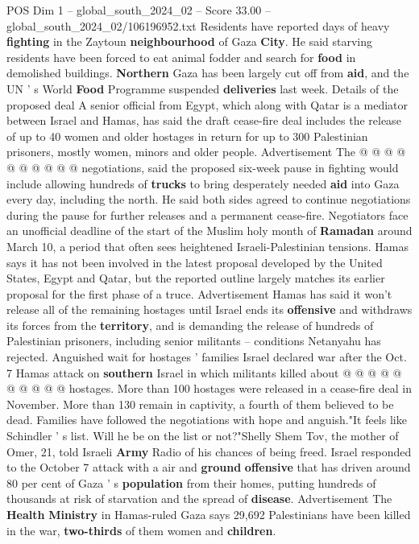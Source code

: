 \begin{textsample}{POS Dim 1 – global\_south\_2024\_02 – Score 33.00 – global\_south\_2024\_02/106196952.txt}
Residents have reported days of heavy \textbf{fighting} in the Zaytoun \textbf{neighbourhood} of Gaza \textbf{City}.
He said starving residents have been forced to eat animal fodder and search for \textbf{food} in demolished buildings. \textbf{Northern} Gaza has been largely cut off from \textbf{aid}, and the UN ' s World \textbf{Food} Programme suspended \textbf{deliveries} last week.
Details of the proposed deal A senior official from Egypt, which along with Qatar is a mediator between Israel and Hamas, has said the draft cease-fire deal includes the release of up to 40 women and older hostages in return for up to 300 Palestinian prisoners, mostly women, minors and older people.
Advertisement The @ @ @ @ @ @ @ @ @ @ negotiations, said the proposed six-week pause in fighting would include allowing hundreds of \textbf{trucks} to bring desperately needed \textbf{aid} into Gaza every day, including the north.
He said both sides agreed to continue negotiations during the pause for further releases and a permanent cease-fire.
Negotiators face an unofficial deadline of the start of the Muslim holy month of \textbf{Ramadan} around March 10, a period that often sees heightened Israeli-Palestinian tensions.
Hamas says it has not been involved in the latest proposal developed by the United States, Egypt and Qatar, but the reported outline largely matches its earlier proposal for the first phase of a truce.
Advertisement Hamas has said it won't release all of the remaining hostages until Israel ends its \textbf{offensive} and withdraws its forces from the \textbf{territory}, and is demanding the release of hundreds of Palestinian prisoners, including senior militants -- conditions Netanyahu has rejected.
Anguished wait for hostages ' families Israel declared war after the Oct. 7 Hamas attack on \textbf{southern} Israel in which militants killed about @ @ @ @ @ @ @ @ @ @ hostages.
More than 100 hostages were released in a cease-fire deal in November.
More than 130 remain in captivity, a fourth of them believed to be dead.
Families have followed the negotiations with hope and anguish."It feels like Schindler ' s list.
Will he be on the list or not?"Shelly Shem Tov, the mother of Omer, 21, told Israeli \textbf{Army} Radio of his chances of being freed.
Israel responded to the October 7 attack with a air and \textbf{ground} \textbf{offensive} that has driven around 80 per cent of Gaza ' s \textbf{population} from their homes, putting hundreds of thousands at risk of starvation and the spread of \textbf{disease}.
Advertisement The \textbf{Health} \textbf{Ministry} in Hamas-ruled Gaza says 29,692 Palestinians have been killed in the war, \textbf{two-thirds} of them women and \textbf{children}.

\end{textsample}
